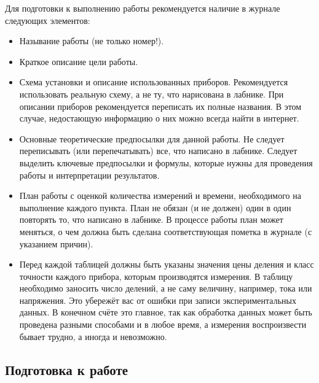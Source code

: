 Для подготовки к выполнению работы рекомендуется наличие в журнале следующих элементов:
\begin{itemize}
    \item Называние работы (не только номер!).
    \item Краткое описание цели работы.
    \item Схема установки и описание использованных приборов. Рекомендуется использовать реальную схему, а не ту, что нарисована в лабнике. При описании приборов рекомендуется переписать их полные названия. В этом случае, недостающую информацию о них можно всегда найти в интернет.
    \item Основные теоретические предпосылки для данной работы. Не следует переписывать (или перепечатывать) все, что написано в лабнике. Следует выделить ключевые предпосылки и формулы, которые нужны для проведения работы и интерпретации результатов.
    \item План работы с оценкой количества измерений и времени, необходимого на выполнение каждого пункта. План не обязан (и не должен) один в один повторять то, что написано в лабнике. В процессе работы план может меняться, о чем должна быть сделана соответствующая пометка в журнале (с указанием причин).
    
    \item Перед каждой таблицей должны быть указаны значения цены деления и класс точности каждого прибора, которым производятся измерения. В таблицу необходимо заносить число делений, а не саму величину, например, тока или напряжения. Это убережёт вас от ошибки при записи экспериментальных данных. В конечном счёте это главное, так как обработка данных может быть проведена разными способами и в любое время, а измерения воспроизвести бывает трудно, а иногда и невозможно.
\end{itemize}

\subsection{Подготовка к работе}

